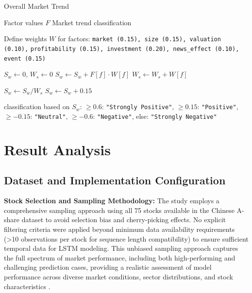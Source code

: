 \documentclass[3p,times,procedia]{elsarticle}
\begin{document}
\begin{algorithm}[H]
\caption{Overall Market Trend}
\label{alg:market_trend}
\begin{algorithmic}[1]
    \Require Factor values $F$
    \Ensure Market trend classification
    
    \State Define weights $W$ for factors: \texttt{market (0.15), size (0.15), valuation (0.10),}
    \Statex \hspace{8mm} \texttt{profitability (0.15), investment (0.20), news\_effect (0.10), event (0.15)}
    
    \State $S_w \gets 0$, $W_s \gets 0$
            \State $S_w \gets S_w + F[f] \cdot W[f]$
            \State $W_s \gets W_s + W[f]$
        \EndIf
    \EndFor
    
     \State $S_w \gets S_w / W_s$ \EndIf
    \State $S_w \gets S_w + 0.15$ 

    \State \Return classification based on $S_w$: 
    \Statex \hspace{4mm} $\geq 0.6$: \texttt{"Strongly Positive"}, 
    $\geq 0.15$: \texttt{"Positive"},
    \Statex \hspace{4mm} $\geq -0.15$: \texttt{"Neutral"},
    $\geq -0.6$: \texttt{"Negative"}, else: \texttt{"Strongly Negative"}
\end{algorithmic}
\end{algorithm}

\vspace{0.5cm}
\section{Result Analysis}

\subsection{Dataset and Implementation Configuration}

\textbf{Stock Selection and Sampling Methodology:} The study employs a comprehensive sampling approach using all 75 stocks available in the Chinese A-share dataset to avoid selection bias and cherry-picking effects. No explicit filtering criteria were applied beyond minimum data availability requirements (>10 observations per stock for sequence length compatibility) to ensure sufficient temporal data for LSTM modeling. This unbiased sampling approach captures the full spectrum of market performance, including both high-performing and challenging prediction cases, providing a realistic assessment of model performance across diverse market conditions, sector distributions, and stock characteristics \cite{FinReportDataset2025}.
\end{document}
